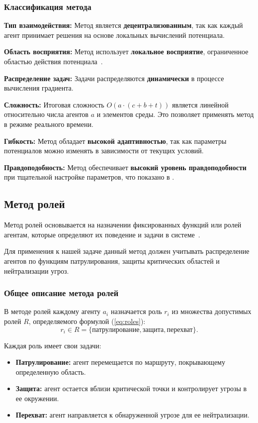 \subsubsection*{Классификация метода}
\textbf{Тип взаимодействия:}  
Метод является \textbf{децентрализованным}, так как каждый агент принимает решения на основе локальных вычислений потенциала.  

\textbf{Область восприятия:}  
Метод использует \textbf{локальное восприятие}, ограниченное областью действия потенциала~\cite{bvp-planning}.

\textbf{Распределение задач:}  
Задачи распределяются \textbf{динамически} в процессе вычисления градиента.  

\textbf{Сложность:}  
Итоговая сложность $O(a \cdot (c + b + t))$ является линейной относительно числа агентов $a$ и элементов среды.
Это позволяет применять метод в режиме реального времени.  

\textbf{Гибкость:}  
Метод обладает \textbf{высокой адаптивностью}, так как параметры потенциалов можно изменять в зависимости от текущих условий.

\textbf{Правдоподобность:}  
Метод обеспечивает \textbf{высокий уровень правдоподобности} при тщательной настройке параметров, что показано в \cite{rts-potential-fields}.

\subsection{Метод ролей}

Метод ролей основывается на назначении фиксированных функций или ролей агентам, которые определяют их поведение и задачи в системе~\cite{role-based}.

Для применения к нашей задаче данный метод должен учитывать распределение агентов по функциям патрулирования, защиты критических областей и нейтрализации угроз.

\subsubsection*{Общее описание метода ролей}
В методе ролей каждому агенту $a_i$ назначается роль $r_i$ из множества допустимых ролей $R$, определяемого формулой (\ref{eq:roles}):
\begin{equation}
	\label{eq:roles}
	r_i \in R = \{\text{патрулирование}, \text{защита}, \text{перехват}\}.
\end{equation}

Каждая роль имеет свои задачи:
\begin{itemize}
	\item \textbf{Патрулирование:} агент перемещается по маршруту, покрывающему определенную область.
	\item \textbf{Защита:} агент остается вблизи критической точки и контролирует угрозы в ее окружении.
	\item \textbf{Перехват:} агент направляется к обнаруженной угрозе для ее нейтрализации.
\end{itemize}

